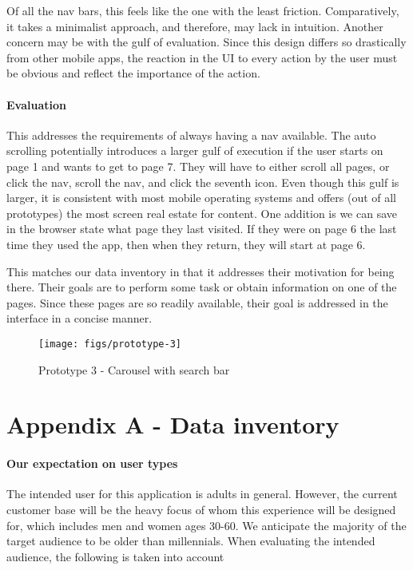 Of all the nav bars, this feels like the one with the least friction. Comparatively, it takes a minimalist approach, and therefore, may lack in intuition. Another concern may be with the gulf of evaluation. Since this design differs so drastically from other mobile apps, the reaction in the UI to every action by the user must be obvious and reflect the importance of the action.

\paragraph{Evaluation} This addresses the requirements of always having a nav available. The auto scrolling potentially introduces a larger gulf of execution if the user starts on page 1 and wants to get to page 7. They will have to either scroll all pages, or click the nav, scroll the nav, and click the seventh icon. Even though this gulf is larger, it is consistent with most mobile operating systems and offers (out of all prototypes) the most screen real estate for content. One addition is we can save in the browser state what page they last visited. If they were on page 6 the last time they used the app, then when they return, they will start at page 6.

This matches our data inventory in that it addresses their motivation for being there. Their goals are to perform some task or obtain information on one of the pages. Since these pages are so readily available, their goal is addressed in the interface in a concise manner.

\begin{figure}[H]
  \centering
  \texttt{[image: figs/prototype-3]}
  \caption{Prototype 3 - Carousel with search bar}
  \label{fig::1}
\end{figure}





\clearpage

\section{Appendix A - Data inventory}

\paragraph{Our expectation on user types}
The intended user for this application is adults in general. However, the current customer base will be the heavy focus of whom this experience will be designed for, which includes men and women ages 30-60. We anticipate the majority of the target audience to be older than millennials. When evaluating the intended audience, the following is taken into account

